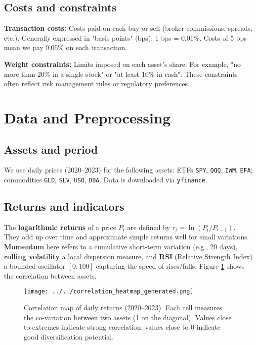 \documentclass[11pt,a4paper]{article}
\begin{document}
\subsection{Costs and constraints}

\textbf{Transaction costs:} Costs paid on each buy or sell (broker commissions, spreads, etc.). Generally expressed in "basis points" (bps): 1 bps = 0.01\%. Costs of 5 bps mean we pay 0.05\% on each transaction.

\textbf{Weight constraints:} Limits imposed on each asset's share. For example, "no more than 20\% in a single stock" or "at least 10\% in cash". These constraints often reflect risk management rules or regulatory preferences.

\section{Data and Preprocessing}
\subsection{Assets and period}
We use daily prices (2020--2023) for the following assets: ETFs \texttt{SPY}, \texttt{QQQ}, \texttt{IWM}, \texttt{EFA}; commodities \texttt{GLD}, \texttt{SLV}, \texttt{USO}, \texttt{DBA}. Data is downloaded via \texttt{yfinance}.

\subsection{Returns and indicators}
The \textbf{logarithmic returns} of a price \(P_t\) are defined by \(r_t = \ln(P_t/P_{t-1})\). They add up over time and approximate simple returns well for small variations.
\textbf{Momentum} here refers to a cumulative short-term variation (e.g., 20 days), \textbf{rolling volatility} a local dispersion measure, and \textbf{RSI} (Relative Strength Index) a bounded oscillator \([0,100]\) capturing the speed of rises/falls. Figure \ref{fig:corr_external} shows the correlation between assets.

\begin{figure}[h]
  \centering
  \texttt{[image: ../../correlation\_heatmap\_generated.png]}
  \caption{Correlation map of daily returns (2020--2023). Each cell measures the co-variation between two assets (1 on the diagonal). Values close to extremes indicate strong correlation; values close to 0 indicate good diversification potential.}
  \label{fig:corr_external}
\end{figure}
\end{document}
